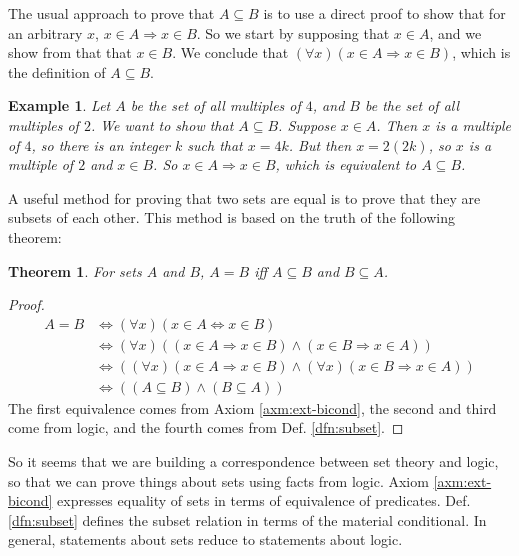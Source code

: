 \documentclass[12pt]{article}
\newcounter{thmc}
\newcounter{exc}
\newtheorem{thm}[thmc]{Theorem}
\newtheorem{ex}[exc]{Example}
\begin{document}
The usual approach to prove that $A\subseteq B$ is to use a direct
proof to show that for an arbitrary $x$, $x\in A \Rightarrow x\in B$.
So we start by supposing that $x\in A$, and we show from that that
$x\in B$.  We conclude that $(\forall x)(x\in A \Rightarrow x\in B)$,
which is the definition of $A\subseteq B$.

\begin{ex}
  Let $A$ be the set of all multiples of $4$, and $B$ be the set of
  all multiples of $2$.  We want to show that $A\subseteq B$.  Suppose
  $x\in A$.  Then $x$ is a multiple of $4$, so there is an integer $k$
  such that $x=4k$.  But then $x=2(2k)$, so $x$ is a multiple of $2$
  and $x\in B$.  So $x\in A \Rightarrow x\in B$, which is equivalent
  to $A\subseteq B$.
\end{ex}


A useful method for proving that two sets are equal is to prove that
they are subsets of each other.  This method is based on the truth of
the following theorem:

\begin{thm}\label{thm:eq}
  For sets $A$ and $B$, $A=B$ iff $A\subseteq B$ and $B\subseteq A$.
\end{thm}

\begin{proof}
  \begin{align*}
    A=B
    &\Leftrightarrow (\forall x)(x\in A \Leftrightarrow x\in B)\\
    &\Leftrightarrow (\forall x)((x\in A \Rightarrow x\in B) \wedge (x\in B \Rightarrow x\in A)) \\
    &\Leftrightarrow ((\forall x)(x\in A \Rightarrow x\in B) \wedge (\forall x)(x\in B \Rightarrow x\in A)) \\
    &\Leftrightarrow ((A\subseteq B) \wedge (B\subseteq A))
  \end{align*}
  The first equivalence comes from Axiom \ref{axm:ext-bicond}, the
  second and third come from logic, and the fourth comes from
  Def. \ref{dfn:subset}.
\end{proof}
   
So it seems that we are building a correspondence between set theory
and logic, so that we can prove things about sets using facts from
logic.  Axiom \ref{axm:ext-bicond} expresses equality of sets in terms
of equivalence of predicates.  Def. \ref{dfn:subset} defines the
subset relation in terms of the material conditional.  In general,
statements about sets reduce to statements about logic.
\end{document}

